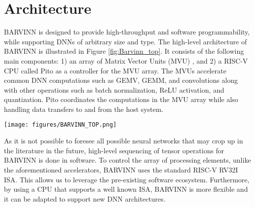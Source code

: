 \documentclass[sigconf]{acmart}
\newcommand{\MVU}{MVU}
\newcommand{\MatrixVectorUnit}{Matrix Vector Unit}
\newcommand{\barvinn}{BARVINN}
\newcommand{\BARVINN}{BARVINN}
\newcommand{\pito}{Pito}
\begin{document}


\section{Architecture}
\label{sec:design}
\BARVINN{} is designed to provide high-throughput and software programmability, while supporting DNNs of arbitrary size and type.
The high-level architecture of BARVINN is illustrated in Figure \ref{fig:Barvinn_top}.
It consists of the following main components: 1) an array of \MatrixVectorUnit{}s (\MVU{}) \cite{bilaniuk2019bitslice}, and 2) a RISC-V CPU
called \pito{} \cite{9401617}
as a controller for the \MVU{} array. The \MVU{}s accelerate common DNN computations such as GEMV, GEMM, and convolutions along with other operations such as batch normalization, ReLU activation, and quantization. \pito{} coordinates the computations in the \MVU{} array while also handling data transfers to and from the host system. 

\begin{figure*}[!h]
  \centering
    \texttt{[image: figures/BARVINN\_TOP.png]}
    \small
\caption{\BARVINN{} hardware architecture with MVU array and Pito RISC-V controller. Right side is MVU detail.}
\label{fig:Barvinn_top}
\vspace{-2mm}
\end{figure*}

As it is not possible to foresee all possible neural networks that may crop up in the literature in the future, high-level sequencing of tensor operations for BARVINN is done in software. 
To control the array of processing elements, unlike the aforementioned accelerators, BARVINN uses the standard RISC-V RV32I ISA. This allows us to leverage the pre-existing software ecosystem. Furthermore, by using a CPU that supports a well known ISA, BARVINN is more flexible and it can be adapted to support new DNN architectures.
\end{document}
